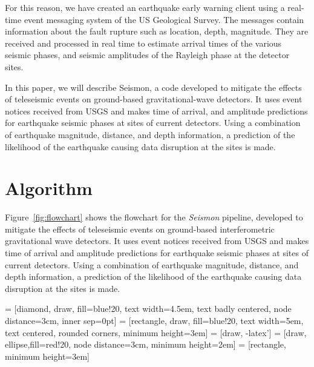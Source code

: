 \documentclass[reprint, prl, aps, showpacs]{revtex4-1}
\begin{document}
For this reason, we have created an earthquake early warning client using a real-time event messaging system of the US Geological Survey. The messages contain information about the fault rupture such as location, depth, magnitude. They are received and processed in real time to estimate arrival times of the various seismic phases, and seismic amplitudes of the Rayleigh phase at the detector sites.

In this paper, we will describe Seismon, a code developed to mitigate the effects of teleseismic events on ground-based gravitational-wave detectors. It uses event notices received from USGS and makes time of arrival, and amplitude predictions for earthquake seismic phases at sites of current detectors. Using a combination of earthquake magnitude, distance, and depth information, a prediction of the likelihood of the earthquake causing data disruption at the sites is made.

\section{Algorithm}
\label{sec:algorithm}

Figure~\ref{fig:flowchart} shows the flowchart for the \emph{Seismon} pipeline, developed to mitigate the effects of teleseismic events on ground-based interferometric gravitational wave detectors. It uses event notices received from USGS and makes time of arrival and amplitude predictions for earthquake seismic phases at sites of current detectors. Using a combination of earthquake magnitude, distance, and depth information, a prediction of the likelihood of the earthquake causing data disruption at the sites is made.

 = [diamond, draw, fill=blue!20,
    text width=4.5em, text badly centered, node distance=3cm, inner sep=0pt]
 = [rectangle, draw, fill=blue!20,
    text width=5em, text centered, rounded corners, minimum height=3em]
 = [draw, -latex']
 = [draw, ellipse,fill=red!20, node distance=3cm,
    minimum height=2em]
 = [rectangle, minimum height=3em]
\end{document}
